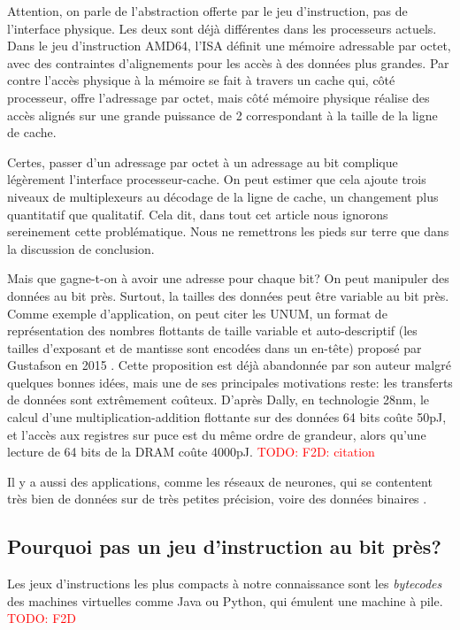 \documentclass[architecture]{compas2018}
\newcommand{\todo}[1]{\textcolor{red}{TODO: #1}}
\begin{document}
Attention, on parle de l'abstraction offerte par le jeu d'instruction, pas de l'interface physique.
Les deux sont déjà différentes dans les processeurs actuels.
Dans le jeu d'instruction AMD64, l'ISA définit une mémoire adressable par octet, avec des contraintes d'alignements pour les accès à des données plus grandes.
Par contre l'accès physique à la mémoire se fait à travers un cache qui, côté processeur, offre l'adressage par octet, mais côté mémoire physique  réalise des accès alignés sur une grande puissance de 2 correspondant à la taille de la ligne de cache.

Certes, passer d'un adressage par octet à un adressage au bit complique légèrement l'interface processeur-cache.
On peut estimer que cela ajoute trois niveaux de multiplexeurs au décodage de la ligne de cache, un changement plus quantitatif que qualitatif.
Cela dit, dans tout cet article nous ignorons sereinement cette problématique.
Nous ne remettrons les pieds sur terre que dans la discussion de conclusion.


Mais que gagne-t-on à avoir une adresse pour chaque bit?  On peut manipuler des données au bit près.
Surtout, la tailles des données peut être variable au bit près.
Comme exemple d'application, on peut citer les UNUM, un format de représentation des nombres flottants de taille variable et auto-descriptif (les tailles d'exposant et de mantisse sont encodées dans un en-tête) proposé par  Gustafson en 2015 \cite{2015-02-GUSTAFSON}.
Cette proposition est déjà abandonnée par son auteur \cite{2016-09-TICHY} malgré quelques bonnes idées, mais une de ses principales motivations reste: les transferts de données sont extrêmement coûteux.
D'après Dally, en technologie 28nm, le calcul d'une multiplication-addition flottante sur des données 64 bits coûte 50pJ, et l'accès aux registres sur puce est du même ordre de grandeur, alors qu'une lecture de 64 bits de la DRAM coûte 4000pJ.
\todo{F2D: citation}

Il y a aussi des applications, comme les réseaux de neurones, qui se contentent très bien de données sur de très petites précision, voire des données binaires \cite{AndriCRB16,AlemdarEtAl2017:TernaryCNN,AmiriEtAl2018:mixedPrecCNN,Preusser:DATE2018:heteroCNN}. 

\subsection{Pourquoi pas un jeu d'instruction au bit près?}

Les jeux d'instructions les plus compacts à notre connaissance sont les \emph{bytecodes} des machines virtuelles comme Java ou Python, qui émulent une machine à pile.
\todo{F2D}
\end{document}
